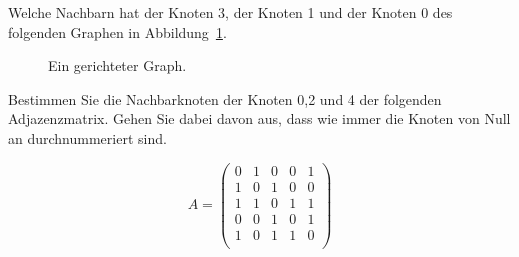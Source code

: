 \begin{aufg}
Welche Nachbarn hat der Knoten 3, der Knoten 1 und der Knoten 0 des folgenden Graphen in Abbildung~\ref{fig:auf:graph2}.


\begin{figure}[htb]
\begin{center}
\caption{Ein gerichteter Graph.}
\label{fig:auf:graph2}
\end{center}
\end{figure}

\end{aufg}


\begin{aufg}
Bestimmen Sie die Nachbarknoten der Knoten 0,2 und 4 der folgenden Adjazenzmatrix. 
Gehen Sie dabei davon aus, dass wie immer die Knoten von Null an durchnummeriert sind.


\[ A =  \begin{pmatrix}
  0 & 1 & 0 & 0 & 1 \\
  1 & 0 & 1 & 0 & 0 \\
  1 & 1 & 0 & 1 & 1  \\
  0 & 0 & 1 & 0 & 1 \\
  1 & 0 & 1 & 1 & 0 \\
 \end{pmatrix}
\]

\end{aufg}



